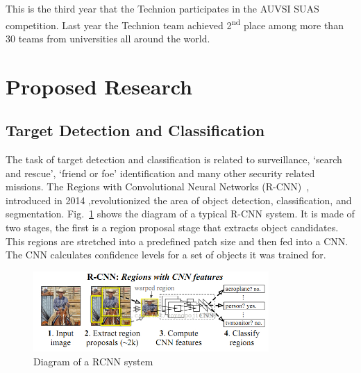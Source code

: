 \documentclass{article} %
\begin{document}
This is the third year that the Technion participates in the AUVSI SUAS
competition. Last year the Technion team achieved 2\textsuperscript{nd} place
among more than 30 teams from universities all around the world.

\section{Proposed Research}

\subsection{Target Detection and Classification}
\label{sec:target_detect_and_class}

The task of target detection and classification is related to surveillance,
`search and rescue', `friend or foe' identification and many other security
related missions. The Regions with Convolutional Neural Networks
(R-CNN)~\cite{Girshick2014}, introduced in 2014 ,revolutionized the area of
object detection, classification, and segmentation. Fig.~\ref{fig:RCNN} shows the
diagram of a typical R-CNN system. It is made of two stages, the first is a
region proposal stage that extracts object candidates. This regions are
stretched into a predefined patch size and then fed into a CNN. The CNN
calculates confidence levels for a set of objects it was trained for.
\begin{figure}[h]
	\centering
	\includegraphics[width=0.8\textwidth]{RCNN}
	\caption{Diagram of a RCNN system}
	\label{fig:RCNN}
\end{figure}
\end{document}
